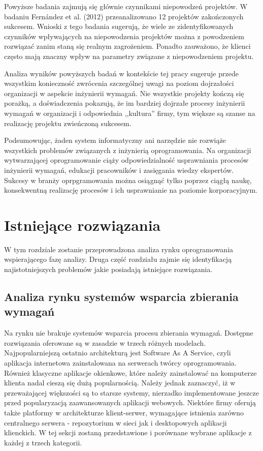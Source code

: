   Powyższe badania zajmują się głównie czynnikami niepowodzeń projektów. W badaniu Fern\'{a}ndez et al. (2012) przeanalizowano 12 projektów zakończonych sukcesem. Wnioski z tego badania sugerują, że wiele ze zidentyfikowanych czynników wpływających na niepowodzenia projektów można z powodzeniem rozwiązać zanim staną się realnym zagrożeniem. Ponadto zauważono, że klienci często mają znaczny wpływ na parametry związane z niepowodzeniem projektu. 

  Analiza wyników powyższych badań w kontekście tej pracy sugeruje przede wszystkim konieczność zwrócenia szczególnej uwagi na poziom dojrzałości organizacji w aspekcie inżynierii wymagań. Nie wszystkie projekty kończą się porażką, a doświadczenia pokazują, że im bardziej dojrzałe procesy inżynierii wymagań w organizacji i odpowiednia ,,kultura'' firmy, tym większe są szanse na realizację projektu zwieńczoną sukcesem. 

  Podsumowując, żaden system informatyczny ani narzędzie nie rozwiąże wszystkich problemów związanych z inżynierią oprogramowania. Na organizacji wytwarzającej oprogramowanie ciąży odpowiedzialność usprawniania procesów inżynierii wymagań, edukacji pracowników i zasięgania wiedzy ekspertów. Sukcesy w branży oprpgramowania można osiągnąć tylko poprzez ciągłą naukę, konsekwentną realizację procesów i ich usprawnianie na poziomie korporacyjnym.

\chapter{Istniejące rozwiązania}


  W tym rozdziale zostanie przeprowadzona analiza rynku oprogramowania wspierającego fazę analizy. Druga część rozdziału zajmie się identyfikacją najistotniejszych problemów jakie posiadają istniejące rozwiązania. 

  \section{Analiza rynku systemów wsparcia zbierania wymagań}

    Na rynku nie brakuje systemów wsparcia procesu zbierania wymagań. Dostępne rozwiązania oferowane są w zasadzie w trzech różnych modelach. Najpopularniejszą ostatnio architekturą jest Software As A Service, czyli aplikacja internetowa zainstalowana na serwerach twórcy oprogramowania. Również klasyczne aplikacje okienkowe, które należy zainstalować na komputerze klienta nadal cieszą się dużą popularnością. Należy jednak zaznaczyć, iż w przeważającej większości są to starsze systemy, nierzadko implementowane jeszcze przed popularyzacją zaawansowanych aplikacji webowych. Niektóre firmy oferują także platformy w architekturze klient-serwer, wymagające istnienia zarówno centralnego serwera - repozytorium w sieci jak i desktopowych aplikacji klienckich. W tej sekcji zostaną przedstawione i porównane wybrane aplikacje z każdej z trzech kategorii. 

